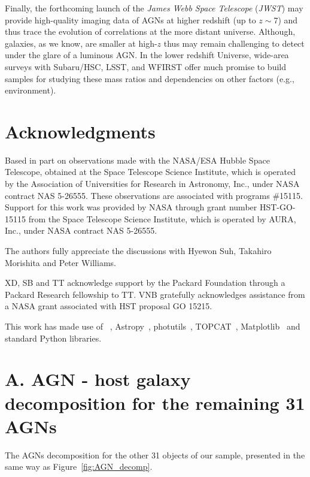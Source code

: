 \documentclass[apj]{emulateapj}
\begin{document}
Finally, the forthcoming launch of the {\it James Webb Space Telescope} ({\it JWST}) may provide high-quality imaging data of AGNs at higher redshift (up to $z\sim7$) and thus trace the evolution of correlations at the more distant universe. Although, galaxies, as we know, are smaller at high-$z$ thus may remain challenging to detect under the glare of a luminous AGN. In the lower redshift Universe, wide-area surveys with Subaru/HSC, LSST, and WFIRST offer much promise to build samples for studying these mass ratios and dependencies on other factors (e.g., environment).  

\section*{Acknowledgments}
Based in part on observations made with the NASA/ESA Hubble Space Telescope, obtained at the Space Telescope Science Institute, which is operated by the Association of Universities for Research in Astronomy, Inc., under NASA contract NAS 5-26555. These observations are associated with programs
\#15115. Support for this work was provided by NASA through grant number HST-GO-15115 from the Space Telescope Science Institute, which is operated by AURA, Inc., under NASA contract NAS 5-26555.

The authors fully appreciate the discussions with Hyewon Suh, Takahiro Morishita and Peter Williams.

XD, SB and TT acknowledge support by the Packard Foundation through a Packard Research fellowship to TT. VNB gratefully acknowledges assistance from a NASA grant associated with HST proposal GO 15215.


This work has made use of \lenstronomy~\citep{lenstronomy}, {\sc Astropy}~\citep{Astropy}, {\sc photutils}~\citep{photutils}, {\sc TOPCAT}~\citep{TOPCAT}, {\sc Matplotlib}~\citep{Matplotlib} %
and standard Python libraries.




\newpage

\appendix

\section{A. AGN - host galaxy decomposition for the remaining 31 AGNs}\label{sec:restsample}
The AGNs decomposition for the other 31 objects of our sample, presented in the same way as Figure~\ref{fig:AGN_decomp}.
\end{document}
